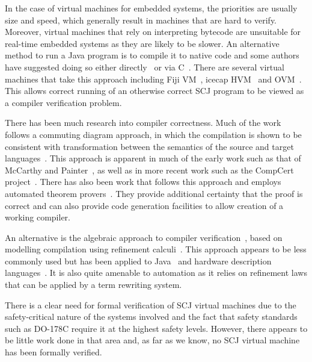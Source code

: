 In the case of virtual machines for embedded systems, the priorities
are usually size and speed, which generally result in machines that
are hard to verify.
Moreover, virtual machines that rely on interpreting bytecode are
unsuitable for real-time embedded systems as they are likely to be
slower.
An alternative method to run a Java program is to compile it to native
code and some authors have suggested doing so either
directly~\cite{schultz2003} or via C~\cite{varma2004}.
There are several virtual machines that take this approach including
Fiji VM~\cite{pizlo2009}, icecap HVM~\cite{sondergaard2012} and
OVM~\cite{armbruster2007}.
This allows correct running of an otherwise correct SCJ program to be
viewed as a compiler verification problem.

There has been much research into compiler correctness.
Much of the work follows a commuting diagram approach, in which the
compilation is shown to be consistent with transformation between the
semantics of the source and target languages~\cite{morris1973,
  thatcher1979}.
This approach is apparent in much of the early work such as that of
McCarthy and Painter~\cite{mccarthy1967}, as well as in more recent
work such as the CompCert project~\cite{leroy2009a, leroy2009b}.
There has also been work that follows this approach and employs
automated theorem provers~\cite{klein2006, milner1972, nipkow2000}.
They provide additional certainty that the proof is correct and can
also provide code generation facilities to allow creation of a working
compiler.

An alternative is the algebraic approach to compiler
verification~\cite{hoare1991, sampaio1993}, based on modelling
compilation using refinement calculi~\cite{back1981, morgan1990,
  morris1987}.
This approach appears to be less commonly used but has been applied to
Java~\cite{duran2005, duran2010} and hardware description
languages~\cite{perna2010, perna2011}.
It is also quite amenable to automation as it relies on refinement
laws that can be applied by a term rewriting system.

There is a clear need for formal verification of SCJ virtual machines
due to the safety-critical nature of the systems involved and the fact
that safety standards such as DO-178C require it at the highest safety
levels.
However, there appears to be little work done in that area and, as far
as we know, no SCJ virtual machine has been formally verified.


